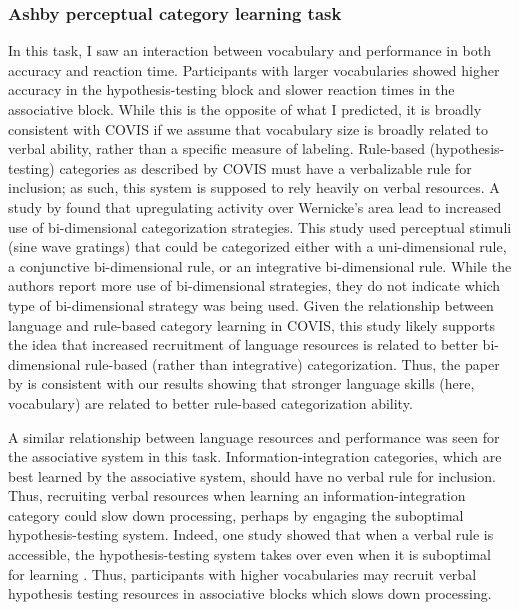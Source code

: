 \documentclass[../dissertation.tex]{subfiles}
\begin{document}
\subsubsection{Ashby perceptual category learning task}
	In this task, I saw an interaction between vocabulary and performance in both accuracy and reaction time. Participants with larger vocabularies showed higher accuracy in the hypothesis-testing block and slower reaction times in the associative block. While this is the opposite of what I predicted, it is broadly consistent with COVIS if we assume that vocabulary size is broadly related to verbal ability, rather than a specific measure of labeling. Rule-based (hypothesis-testing) categories as described by COVIS must have a verbalizable rule for inclusion; as such, this system is supposed to rely heavily on verbal resources. A study by \citet{Perry2014} found that upregulating activity over Wernicke's area lead to increased use of bi-dimensional categorization strategies. This study used perceptual stimuli (sine wave gratings) that could be categorized either with a uni-dimensional rule, a conjunctive bi-dimensional rule, or an integrative bi-dimensional rule. While the authors report more use of bi-dimensional strategies, they do not indicate which type of bi-dimensional strategy was being used. Given the relationship between language and rule-based category learning in COVIS, this study likely supports the idea that increased recruitment of language resources is related to better bi-dimensional rule-based (rather than integrative) categorization. Thus, the paper by  \citet{Perry2014} is consistent with our results showing that stronger language skills (here, vocabulary) are related to better rule-based categorization ability. \par
	 A similar relationship between language resources and performance was seen for the associative system in this task. Information-integration categories, which are best learned by the associative system, should have no verbal rule for inclusion. Thus, recruiting verbal resources when learning an information-integration category could slow down processing, perhaps by engaging the suboptimal hypothesis-testing system. Indeed, one study showed that when a verbal rule is accessible, the hypothesis-testing system takes over even when it is suboptimal for learning \citep{Noseworthy2011}. Thus, participants with higher vocabularies may recruit verbal hypothesis testing resources in associative blocks which slows down processing. \par
\end{document}
